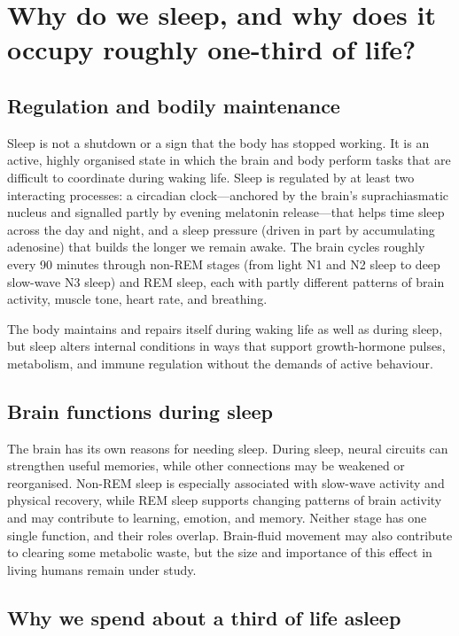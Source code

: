 \documentclass[11pt,oneside]{report}
\begin{document}
\section{Why do we sleep, and why does it occupy roughly one-third of life?}

\subsection*{Regulation and bodily maintenance}

Sleep is not a shutdown or a sign that the body has stopped working. It is an
active, highly organised state in which the brain and body perform tasks that
are difficult to coordinate during waking life. Sleep is regulated by at least
two interacting processes: a circadian clock—anchored by the brain's
suprachiasmatic nucleus and signalled partly by evening melatonin release—that
helps time sleep across the day and night, and a sleep pressure (driven in part
by accumulating adenosine) that builds the longer we remain awake. The brain
cycles roughly every 90 minutes through non-REM stages (from light N1 and N2
sleep to deep slow-wave N3 sleep) and REM sleep, each with partly different
patterns of brain activity, muscle tone, heart rate, and breathing.

The body maintains and repairs itself during waking life as well as during
sleep, but sleep alters internal conditions in ways that support growth-hormone
pulses, metabolism, and immune regulation without the demands of active
behaviour.

\subsection*{Brain functions during sleep}

The brain has its own reasons for needing sleep. During sleep, neural circuits
can strengthen useful memories, while other connections may be weakened or
reorganised. Non-REM sleep is especially associated with slow-wave activity and
physical recovery, while REM sleep supports changing patterns of brain activity
and may contribute to learning, emotion, and memory. Neither stage has one
single function, and their roles overlap. Brain-fluid movement may also
contribute to clearing some metabolic waste, but the size and importance of this
effect in living humans remain under study.

\subsection*{Why we spend about a third of life asleep}
\end{document}
